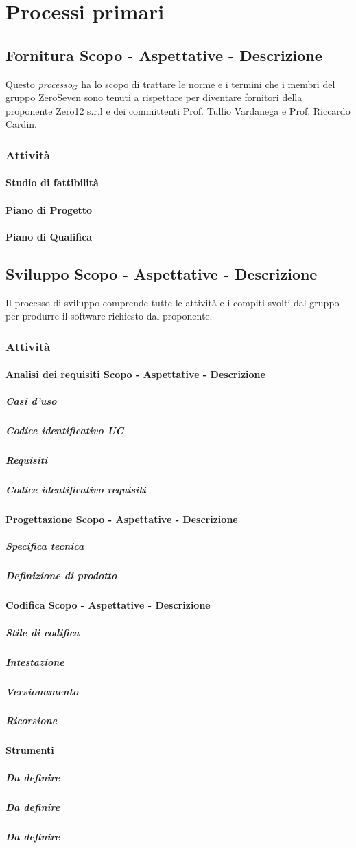 \section{Processi primari}
\subsection{Fornitura Scopo - Aspettative - Descrizione}			
Questo \textit{processo$_{G}$} ha lo scopo di trattare le norme e i termini che i membri del gruppo ZeroSeven sono tenuti a rispettare per diventare fornitori della proponente Zero12 s.r.l e dei committenti Prof. Tullio Vardanega e Prof. Riccardo Cardin.

\subsubsection{Attività}
\paragraph{Studio di fattibilità}

\paragraph{Piano di Progetto}

\paragraph{Piano di Qualifica}

\subsection{Sviluppo Scopo - Aspettative - Descrizione}
Il processo di sviluppo comprende tutte le attività e i compiti svolti dal gruppo per produrre il software richiesto dal proponente.

\subsubsection{Attività}
\paragraph{Analisi dei requisiti Scopo - Aspettative - Descrizione}
\subparagraph{Casi d'uso}
\subparagraph{Codice identificativo UC}
\subparagraph{Requisiti}
\subparagraph{Codice identificativo requisiti}
\paragraph{Progettazione Scopo - Aspettative - Descrizione}
\subparagraph{Specifica tecnica}
\subparagraph{Definizione di prodotto}
\paragraph{Codifica Scopo - Aspettative - Descrizione}
\subparagraph{Stile di codifica}
\subparagraph{Intestazione}
\subparagraph{Versionamento}
\subparagraph{Ricorsione}
\paragraph{Strumenti}
\subparagraph{Da definire}
\subparagraph{Da definire}
\subparagraph{Da definire}



